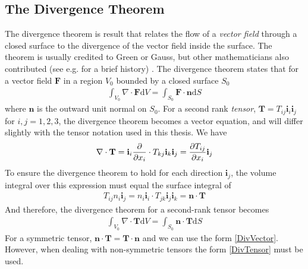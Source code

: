 \subsection{The Divergence Theorem}
The divergence theorem is result that relates the flow of a \textit{vector field} through a closed surface to the divergence of the vector field inside the surface. The theorem is usually credited to Green or Gauss, but other mathematicians also contributed (see e.g. \cite{Katz79} for a brief history) . The divergence theorem states that for a vector field $\mathbf{F}$ in a region $V_0$ bounded by a closed surface $S_0$
\begin{align}
\int_{V_0} \nabla \cdot \mathbf{F} \mathrm{d}V = \int_{S_0} \mathbf{F} \cdot \mathbf{n} \mathrm{d}S \label{DivVector}
\end{align}
where $\mathbf{n}$ is the outward unit normal on $S_0$. For a second rank \textit{tensor}, $\mathbf{T} = T_{ij}\mathbf{i}_i\mathbf{i}_j$ for $i,j = 1,2,3$, the divergence theorem becomes a vector equation, and will differ slightly with the tensor notation used in this thesis. We have 
\begin{align} 
\nabla \cdot \mathbf{T} = \mathbf{i}_i\frac{\partial }{\partial x_i} \cdot T_{kj}\mathbf{i}_k\mathbf{i}_j = \frac{\partial T_{ij}}{\partial x_i} \mathbf{i}_j
\end{align}
To ensure the divergence theorem to hold for each direction $\mathbf{i}_j$, the volume integral over this expression must equal the surface integral of 
\begin{align}
T_{ij} n_i \mathbf{i}_j = n_i \mathbf{i}_i \cdot T_{jk}\mathbf{i}_j \mathbf{i}_k = \mathbf{n} \cdot \mathbf{T}
\end{align}
And therefore, the divergence theorem for a second-rank tensor becomes
\begin{align}
\int_{V_0} \nabla \cdot \mathbf{T} \mathrm{d}V = \int_{S_0} \mathbf{n} \cdot \mathbf{T} \mathrm{d}S \label{DivTensor}
\end{align}
For a symmetric tensor, $\mathbf{n} \cdot \mathbf{T} = \mathbf{T} \cdot \mathbf{n}$ and we can use the form \eqref{DivVector}. However, when dealing with non-symmetric tensors the form \eqref{DivTensor} must be used. 

